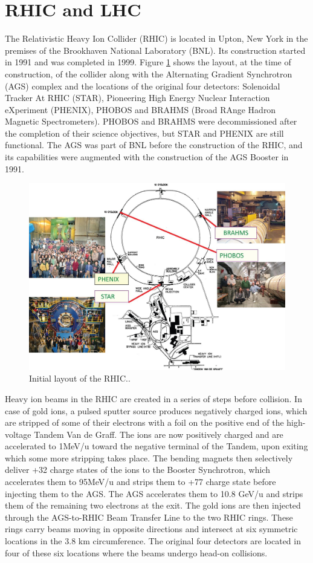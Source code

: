 \section{RHIC and LHC}
The Relativistic Heavy Ion Collider (RHIC) is located in Upton, New York in the premises of the Brookhaven National Laboratory (BNL). Its construction started in 1991 and was completed in 1999. Figure \ref{fig:RHIC_layout} shows the layout, at the time of construction, of the collider along with the Alternating Gradient Synchrotron (AGS) complex and the locations of the original four detectors: Solenoidal Tracker At RHIC (STAR), Pioneering High Energy Nuclear Interaction eXperiment (PHENIX), PHOBOS and BRAHMS (Broad RAnge Hadron Magnetic Spectrometers). PHOBOS and BRAHMS were decommissioned after the completion of their science objectives, but STAR and PHENIX are still functional. The AGS was part of BNL before the construction of the RHIC, and its capabilities were augmented with the construction of the AGS Booster in 1991.
\begin{figure}[h]
  \centering
  \includegraphics[width=6.5in]{figures/RHIC_Layout.jpeg}
  \caption{Initial layout of the RHIC.\cite{doi:10.1093/ptep/ptu093}.}\label{fig:RHIC_layout}
\end{figure}

Heavy ion beams in the RHIC are created in a series of steps before collision. In case of gold ions, a pulsed sputter source produces negatively charged ions, which are stripped of some of their electrons with a foil on the positive end of the high-voltage Tandem Van de Graff. The ions are now positively charged and are accelerated to 1MeV/u toward the negative terminal of the Tandem, upon exiting which some more stripping takes place. The bending magnets then selectively deliver +32 charge states of the ions to the Booster Synchrotron, which accelerates them to 95MeV/u and strips them to +77 charge state before injecting them to the AGS. The AGS accelerates them to 10.8 GeV/u and strips them of the remaining two electrons at the exit. The gold ions are then injected through the AGS-to-RHIC Beam Transfer Line to the two RHIC rings. These rings carry beams moving in opposite directions and intersect at six symmetric locations in the 3.8 km circumference. The original four detectors are located in four of these six locations where the beams undergo head-on collisions.

